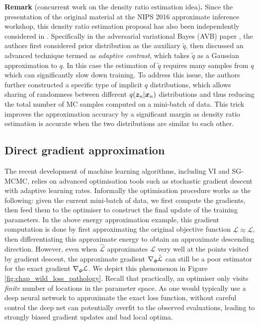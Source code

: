 \vspace{1em}
\begin{tcolorbox}
\textbf{Remark} (concurrent work on the density ratio estimation idea)\textbf{.}
Since the presentation of the original material at the NIPS 2016 approximate inference workshop, this density ratio estimation proposal has also been independently considered in \cite{karaletsos:adversarial_mp2016, mescheder:avb2017, huszar:implicit2017, tran:implicit2017}. Specifically in the adversarial variational Bayes (AVB) paper \citep{mescheder:avb2017}, the authors first considered prior distribution as the auxiliary $\tilde{q}$, then discussed an advanced technique termed as \emph{adaptive contrast}, which takes $\tilde{q}$ as a Gaussian approximation to $q$. In this case the estimation of $\tilde{q}$ requires many samples from $q$ which can significantly slow down training. To address this issue, the authors further constructed a specific type of implicit $q$ distributions, which allows sharing of randomness between different $q(\bm{z}_n | \bm{x}_n)$ distributions and thus reducing the total number of MC samples computed on a mini-batch of data. This trick improves the approximation accuracy by a significant margin as density ratio estimation is accurate when the two distributions are similar to each other.
\end{tcolorbox}

\subsection{Direct gradient approximation}
\label{sec:chap5_grad_approx}
The recent development of machine learning algorithms, including VI and SG-MCMC, relies on advanced optimisation tools such as stochastic gradient descent with adaptive learning rates. Informally the optimisation procedure works as the following: given the current mini-batch of data, we first compute the gradients, then feed them to the optimiser to construct the final update of the training parameters. In the above energy approximation example, this gradient computation is done by first approximating the original objective function $\hat{\mathcal{L}} \approx \mathcal{L}$, then differentiating this approximate energy to obtain an approximate descending direction. However, even when $\hat{\mathcal{L}}$ approximates $\mathcal{L}$ very well at the points visited by gradient descent, the approximate gradient $\nabla_{\bm{\phi}} \hat{\mathcal{L}}$ can still be a poor estimator for the exact gradient $\nabla_{\bm{\phi}} \mathcal{L}$. We depict this phenomenon in Figure \ref{fig:chap_wild_loss_pathology}. Recall that practically, an optimiser only visits \emph{finite} number of locations in the parameter space. As one would typically use a deep neural network to approximate the exact loss function, without careful control the deep net can potentially overfit to the observed evaluations, leading to strongly biased gradient updates and bad local optima.

